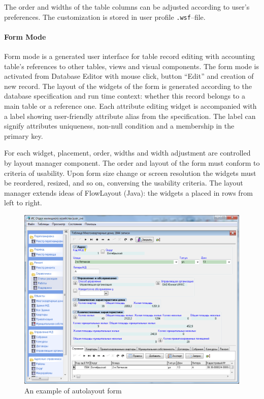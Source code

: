 \documentclass[conference]{IEEEtran}
\begin{document}
The order and widths of the table columns can be adjusted according to user's preferences.  The customization is stored in user profile \texttt{.wsf}--file.

\paragraph{Form Mode}

Form mode is a generated user interface for table record editing with accounting table's references to other tables, views and visual components.  The form mode is activated from Database Editor with mouse click, button ``Edit'' and creation of new record.  The layout of the widgets of the form is generated according to the database specification and run time context: whether this record belongs to a main table or a reference one.  Each attribute editing widget is accompanied with a label showing user-friendly attribute alias from the specification.  The label can signify attributes uniqueness, non-null condition and a membership in the primary key.

For each widget, placement, order, widths and width adjustment are controlled by layout manager component.  The order and layout of the form must conform to criteria of usability.  Upon form size change or screen resolution the widgets must be reordered, resized, and so on, conversing the usability criteria.  The layout manager extends ideas of FlowLayout \cite{flowj} (Java): the widgets a placed in rows from left to right.

\begin{figure}[b]
  \centering
  \includegraphics[width=\linewidth]{formex.png}
  \caption{An example of autolayout form}
  \label{fig:formex}
\end{figure}
\end{document}
